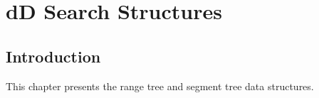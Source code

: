 \def\ccTagRmEigenClassName{\ccFalse}
\def\ccLongParamLayout{\ccTrue}

\ccThreeToTwo

\chapter{dD Search Structures} 
\label{Trees}



\section{Introduction}

This chapter presents the {\cgal} range tree and segment tree
data structures. 










